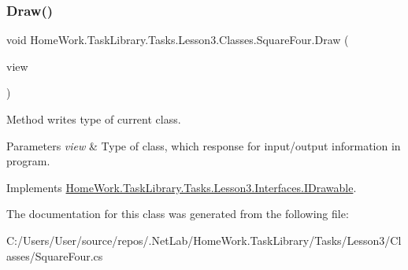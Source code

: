 \subsubsection{\texorpdfstring{Draw()}{Draw()}}
{\footnotesize\ttfamily void Home\+Work.\+Task\+Library.\+Tasks.\+Lesson3.\+Classes.\+Square\+Four.\+Draw (\begin{DoxyParamCaption}\item[{I\+Information}]{view }\end{DoxyParamCaption})}



Method writes type of current class. 


\begin{DoxyParams}{Parameters}
{\em view} & Type of class, which response for input/output information in program.\\
\hline
\end{DoxyParams}


Implements \mbox{\hyperlink{interface_home_work_1_1_task_library_1_1_tasks_1_1_lesson3_1_1_interfaces_1_1_i_drawable_aa4df9dc24fb7a0eb689e4a8b0dc80b09}{Home\+Work.\+Task\+Library.\+Tasks.\+Lesson3.\+Interfaces.\+I\+Drawable}}.



The documentation for this class was generated from the following file\+:\begin{DoxyCompactItemize}
\item 
C\+:/\+Users/\+User/source/repos/.\+Net\+Lab/\+Home\+Work.\+Task\+Library/\+Tasks/\+Lesson3/\+Classes/Square\+Four.\+cs\end{DoxyCompactItemize}
